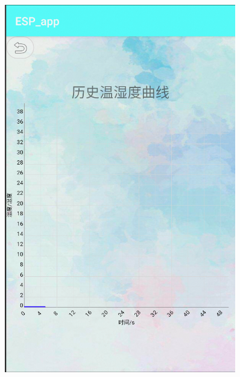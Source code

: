 \begin{figure}[h]
    \begin{minipage}{0.3\textwidth}
        \centering
        \includegraphics[width=0.9\textwidth]{figures/test/2}   
    \end{minipage}
    \begin{minipage}{0.3\textwidth}
        \centering

\end{minipage}
\end{figure}
